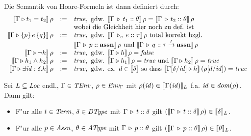 \documentclass[12pt,a4paper,bigheadings]{scrartcl}
\newcommand{\semantic}[1]{\ensuremath{\llbracket#1\rrbracket}}
\newcommand{\assn}{\ensuremath{\mathbf{assn}}}
\newcommand{\TEnv}{\name{TEnv}}
\newcommand{\Dtype}{\name{DType}}
\newcommand{\Atype}{\name{AType}}
\newcommand{\Assn}{\name{Assn}}
\newcommand{\Term}{\name{Term}}
\newcommand{\tto}{\ensuremath{\xrightarrow{t}}}
\newcommand{\Tje}[3]{#1 \,\tr_e\, #2\cc#3}
\begin{document}
\noindent
Die Semantik von Hoare-Formeln ist dann definiert durch:
\[\begin{array}{rcl}
  \semantic{\Tjh{\Gamma}{t_1 = t_2}}\,\rho
  & := &
  \true, \text{ gdw. } \semantic{\Tj{\Gamma}{t_1}{\theta}}\,\rho = \semantic{\Tj{\Gamma}{t_2}{\theta}}\,\rho \\
  && \text{wobei die Gleichheit hier noch zu def. ist}
  \\
  \semantic{\Tjh{\Gamma}{\triple{p}{e}{q}}}\,\rho 
  & := &
  \true, \text{ gdw. } \semantic{\Tje{\Gamma}{e}{\tau}}\,\rho \text{ total korrekt bzgl. } \\
  && \semantic{\Tj{\Gamma}{p}{\assn}}\,\rho \text{ und } \semantic{\Tj{\Gamma}{q}{\tau \tto \assn}}\,\rho
  \\
  \semantic{\Tjh{\Gamma}{\neg h}}\,\rho
  & := &
  \true, \text{ gdw. } \semantic{\Tjh{\Gamma}{h}}\,\rho = \false
  \\
  \semantic{\Tjh{\Gamma}{h_1 \wedge h_2}}\,\rho
  & := &
  \true, \text{ gdw. } \semantic{\Tjh{\Gamma}{h_1}}\,\rho = \true \text{ und }
  \semantic{\Tjh{\Gamma}{h_2}}\,\rho = \true
  \\
  \semantic{\Tjh{\Gamma}{\exists \id:\delta.h}}\,\rho
  & := &
  \true, \text{ gdw. ex. } d \in \semantic{\delta} \text{ so dass }
  \semantic{\Tjh{\Gamma[\delta/\id]}{h}}\,(\rho[d/\id])=\true
\end{array}\]

\begin{satz}
  Sei $L\subseteq{\text{\it Loc\/}}$ endl., $\Gamma\in\TEnv$, $\rho\in{\text{\it Env\/}}_\Gamma$ mit $\rho(\id)\in\semantic{\Gamma(\id)}_L$ f.a.
  ${\text{\it id\/}}\in{\text{\it dom\/}}(\rho)$. Dann gilt:
  \begin{itemize}
    \item F"ur alle $t\in\Term$, $\delta\in\Dtype$ mit $\Gamma \, \triangleright \, t\mathrel{::}\delta$ gilt
          $(\semantic{\Tj{\Gamma}{t}{\delta}}\,\rho)\in\semantic{\delta}_L$.
    \item F"ur alle $p\in\Assn$, $\theta\in\Atype$ mit $\Gamma \, \triangleright \, p\mathrel{::}\theta$ gilt
          $(\semantic{\Tj{\Gamma}{p}{\theta}}\,\rho)\in\semantic{\theta}_L$.
  \end{itemize}
\end{satz}
\end{document}
